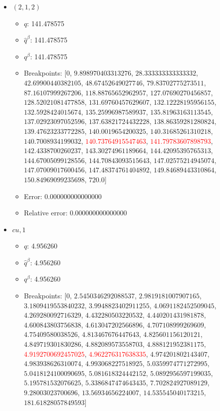 \documentclass{article}%
\begin{document}
\begin{itemize}
\begin{itemize}
		\item Error: 0.000000000000000%
		\item Relative error: 0.000000000000000%
	\end{itemize}%
	\item $(2, 1, 2)$%
	\begin{itemize}%
		\item $q$: 141.478575%
		\item $\hat{q}^\beta$: 141.478575%
		\item $q^\beta$: 141.478575%
		\item Breakpoints: $[$$0$, $9.898970403313276$, $28.333333333333332$, $42.69900440382105$, $48.67452649027746$, $79.83702775273511$, $87.16107999267206$, $118.88765652962957$, $127.07690270456857$, $128.52021081477858$, $131.69760457629607$, $132.12228195956155$, $132.5928424015674$, $135.25996987589937$, $135.81963163113545$, $137.02923097052596$, $137.63821724432228$, $138.86359281280824$, $139.47623233772285$, $140.0019654200325$, $140.31685261310218$, $140.7008934199032$, \textcolor{red}{$140.73764915547463$}, \textcolor{red}{$141.79783607898793$}, $142.4338700260237$, $143.30274961189664$, $144.42095395765313$, $144.67005099128556$, $144.70843093515643$, $147.02575214945074$, $147.07009017600456$, $147.48374761404892$, $149.84689443310864$, $150.84969099235698$, $720.0$$]$%
		\item Error: 0.000000000000000%
		\item Relative error: 0.000000000000000%
	\end{itemize}%
	\item $\textit{cu},1$%
	\begin{itemize}%
		\item $q$: 4.956260%
		\item $\hat{q}^\beta$: 4.956260%
		\item $q^\beta$: 4.956260%
		\item Breakpoints: $[$$0$, $2.5450346292088537$, $2.9819181007907165$, $3.1809419553840232$, $3.9948823402911255$, $4.0691182452509045$, $4.269280092716329$, $4.432280503220532$, $4.440201431981878$, $4.600843803756838$, $4.613047202566896$, $4.707108999269609$, $4.75409580038526$, $4.813467676447643$, $4.825601156120121$, $4.849719301830286$, $4.882089573558703$, $4.888121952381175$, \textcolor{red}{$4.9192700692457025$}, \textcolor{red}{$4.962276317638335$}, $4.974201802143407$, $4.983938626310074$, $4.993068227518925$, $5.0359974771272995$, $5.0418124100090695$, $5.081618324442152$, $5.0892956597199035$, $5.195781532076625$, $5.3386847474643435$, $7.702824927089129$, $9.28003023700696$, $13.56934656224007$, $14.535545040173215$, $181.61828057849593$$]$%

\end{itemize}
\end{itemize}
\end{document}
